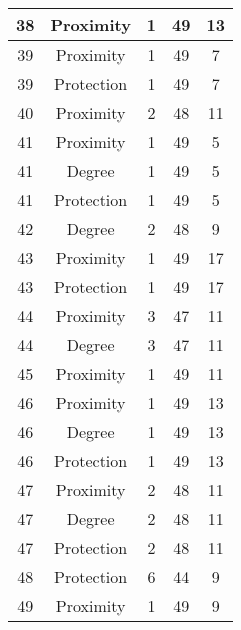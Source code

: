 \documentclass[results.tex]{subfiles}
\begin{document}
\begin{center}
\begin{tabular}{| c || c | c | c | c |}
    \hline
    38 & Proximity & 1 & 49 & 13 \\ 
    \hline
    39 & Proximity & 1 & 49 & 7 \\ 
    \hline
    39 & Protection & 1 & 49 & 7 \\ 
    \hline
    40 & Proximity & 2 & 48 & 11 \\ 
    \hline
    41 & Proximity & 1 & 49 & 5 \\ 
    \hline
    41 & Degree & 1 & 49 & 5 \\ 
    \hline
    41 & Protection & 1 & 49 & 5 \\ 
    \hline
    42 & Degree & 2 & 48 & 9 \\ 
    \hline
    43 & Proximity & 1 & 49 & 17 \\ 
    \hline
    43 & Protection & 1 & 49 & 17 \\ 
    \hline
    44 & Proximity & 3 & 47 & 11 \\ 
    \hline
    44 & Degree & 3 & 47 & 11 \\ 
    \hline
    45 & Proximity & 1 & 49 & 11 \\ 
    \hline
    46 & Proximity & 1 & 49 & 13 \\ 
    \hline
    46 & Degree & 1 & 49 & 13 \\ 
    \hline
    46 & Protection & 1 & 49 & 13 \\ 
    \hline
    47 & Proximity & 2 & 48 & 11 \\ 
    \hline
    47 & Degree & 2 & 48 & 11 \\ 
    \hline
    47 & Protection & 2 & 48 & 11 \\ 
    \hline
    48 & Protection & 6 & 44 & 9 \\ 
    \hline
    49 & Proximity & 1 & 49 & 9 \\ 
    \hline   \end{tabular}
\end{center}
\end{document}

